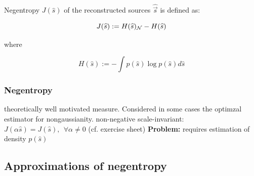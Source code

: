 
Negentropy $J(\widehat{s})$ of the reconstructed sources $\widehat{\vec s}$ is defined as:

\begin{equation}
\label{eq:negentropy}
	J(\widehat{s}) := H(\widehat{s})_{\mathcal{N}} - H(\widehat{s})
\end{equation}

where

\begin{equation}
\label{eq:diffentropyshat}
H(\widehat{s}) := - \int p(\widehat{s}) \log p(\widehat{s}) d\widehat{s}
\end{equation}

\begin{frame} 
\frametitle{Negentropy}


\begin{itemize}
  \itR theoretically well motivated measure. Considered in some cases the optimzal estimator for nongaussianity.
  \itR non-negative
  \itR scale-invariant: $J(\alpha \widehat{s}) = J(\widehat{s}), \ \ \forall \alpha \ne 0$ (cf. exercise sheet)
  \itR \textbf{Problem:} requires estimation of density $p(\widehat{s})$
\end{itemize}


\end{frame}

\subsection{Approximations of negentropy}

